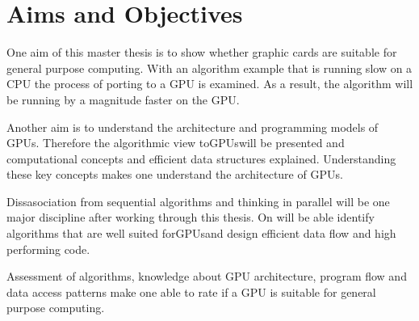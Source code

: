 \section*{Aims and Objectives} 
\label{sub:aims_and_objectives} 


One aim of this master thesis is to show whether graphic cards are suitable for 
general purpose computing. With an algorithm example that is running slow on a 
CPU the process of porting to a \gls{GPU} is examined. As a result, the algorithm
will be running by a magnitude faster on the GPU. 

Another aim is to understand the architecture and programming models of GPUs.
Therefore the algorithmic view to\glspl{GPU}will be presented and computational
concepts and efficient data structures explained. Understanding these key
concepts makes one understand the architecture of GPUs.


Dissasociation from sequential algorithms and thinking in parallel will be one
major discipline after working through this thesis. On will be able identify
algorithms that are well suited for\glspl{GPU}and design efficient data flow and high
performing code.

Assessment of algorithms, knowledge about \gls{GPU} architecture, program flow and
data access patterns make one able to rate if a \gls{GPU} is suitable for general
purpose computing.

